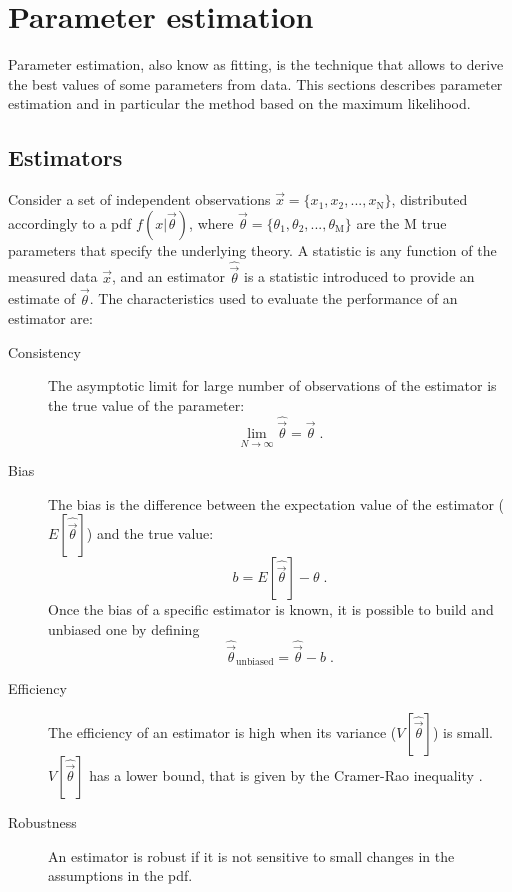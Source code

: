 \section{Parameter estimation}
\label{sec:stat:pe}

Parameter estimation, also know as fitting, is the technique that allows to derive the best values of some parameters from data.
This sections describes parameter estimation and in particular the method based on the maximum likelihood.

\subsection{Estimators}

Consider a set of independent observations $\vec{x}=\{x_1, x_2, ..., x_\mathrm{N}\}$, distributed accordingly to a \gls{pdf} $f(x|\vec{\theta})$, where $\vec{\theta}=\{\theta_1, \theta_2, ..., \theta_\mathrm{M}\}$ are the M true parameters that specify the underlying theory. 
A statistic is any function of the measured data $\vec{x}$, and an estimator $\hat{\vec{\theta}}$ is a statistic introduced to provide an estimate of $\vec{\theta}$.
The characteristics used to evaluate the performance of an estimator are:

\begin{description}
\item[Consistency] The asymptotic limit for large number of observations of the estimator is the true value of the parameter:
\begin{equation}
\label{eq:stat:consistency}
\lim_{N \rightarrow \infty} \hat{\vec{\theta}} = \vec{\theta} \; .
\end{equation}

\item[Bias] The bias is the difference between the expectation value of the estimator ($E[\hat{\vec{\theta}}]$) and the true value:
\begin{equation}
\label{eq:stat:bias}
b = E[\hat{\vec{\theta}}] - \theta \; .
\end{equation}
Once the bias of a specific estimator is known, it is possible to build and unbiased one by defining 
\begin{equation}
\hat{\vec{\theta}}_{\mathrm{unbiased}} = \hat{\vec{\theta}} - b \; .
\end{equation}

\item[Efficiency] The efficiency of an estimator is high when its variance ($V[\hat{\vec{\theta}}]$) is small. $V[\hat{\vec{\theta}}]$ has a lower bound, that is given by the Cramer-Rao inequality \cite{Cramer1946}\cite{Rao1992}.


\item[Robustness] An estimator is robust if it is not sensitive to small changes in the assumptions in the \gls{pdf}.
\end{description}



